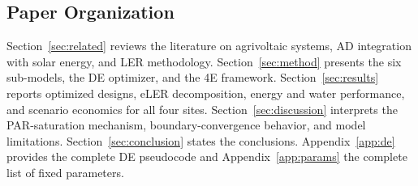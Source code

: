 \subsection{Paper Organization}

\hspace{1cm}Section~\ref{sec:related} reviews the literature on
agrivoltaic systems, AD integration with solar energy, and LER methodology.
Section~\ref{sec:method} presents the six sub-models, the DE optimizer,
and the 4E framework. Section~\ref{sec:results} reports optimized designs,
eLER decomposition, energy and water performance, and scenario economics
for all four sites. Section~\ref{sec:discussion} interprets the
PAR-saturation mechanism, boundary-convergence behavior, and model
limitations. Section~\ref{sec:conclusion} states the conclusions.
Appendix~\ref{app:de} provides the complete DE pseudocode and Appendix~\ref{app:params}  the complete list of fixed parameters.
